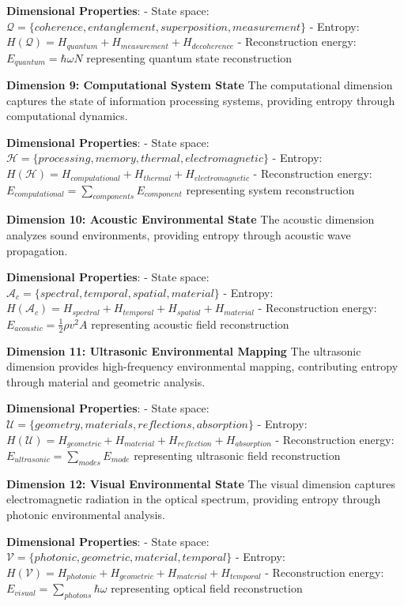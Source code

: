\documentclass[12pt]{article}
\begin{document}
\textbf{Dimensional Properties}:
- State space: $\mathcal{Q} = \{coherence, entanglement, superposition, measurement\}$
- Entropy: $H(\mathcal{Q}) = H_{quantum} + H_{measurement} + H_{decoherence}$
- Reconstruction energy: $E_{quantum} = \hbar \omega N$ representing quantum state reconstruction

\textbf{Dimension 9: Computational System State}
The computational dimension captures the state of information processing systems, providing entropy through computational dynamics.

\textbf{Dimensional Properties}:
- State space: $\mathcal{H} = \{processing, memory, thermal, electromagnetic\}$
- Entropy: $H(\mathcal{H}) = H_{computational} + H_{thermal} + H_{electromagnetic}$
- Reconstruction energy: $E_{computational} = \sum_{components} E_{component}$ representing system reconstruction

\textbf{Dimension 10: Acoustic Environmental State}
The acoustic dimension analyzes sound environments, providing entropy through acoustic wave propagation.

\textbf{Dimensional Properties}:
- State space: $\mathcal{A}_c = \{spectral, temporal, spatial, material\}$
- Entropy: $H(\mathcal{A}_c) = H_{spectral} + H_{temporal} + H_{spatial} + H_{material}$
- Reconstruction energy: $E_{acoustic} = \frac{1}{2}\rho v^2 A$ representing acoustic field reconstruction

\textbf{Dimension 11: Ultrasonic Environmental Mapping}
The ultrasonic dimension provides high-frequency environmental mapping, contributing entropy through material and geometric analysis.

\textbf{Dimensional Properties}:
- State space: $\mathcal{U} = \{geometry, materials, reflections, absorption\}$
- Entropy: $H(\mathcal{U}) = H_{geometric} + H_{material} + H_{reflection} + H_{absorption}$
- Reconstruction energy: $E_{ultrasonic} = \sum_{modes} E_{mode}$ representing ultrasonic field reconstruction

\textbf{Dimension 12: Visual Environmental State}
The visual dimension captures electromagnetic radiation in the optical spectrum, providing entropy through photonic environmental analysis.

\textbf{Dimensional Properties}:
- State space: $\mathcal{V} = \{photonic, geometric, material, temporal\}$
- Entropy: $H(\mathcal{V}) = H_{photonic} + H_{geometric} + H_{material} + H_{temporal}$
- Reconstruction energy: $E_{visual} = \sum_{photons} \hbar \omega$ representing optical field reconstruction
\end{document}
